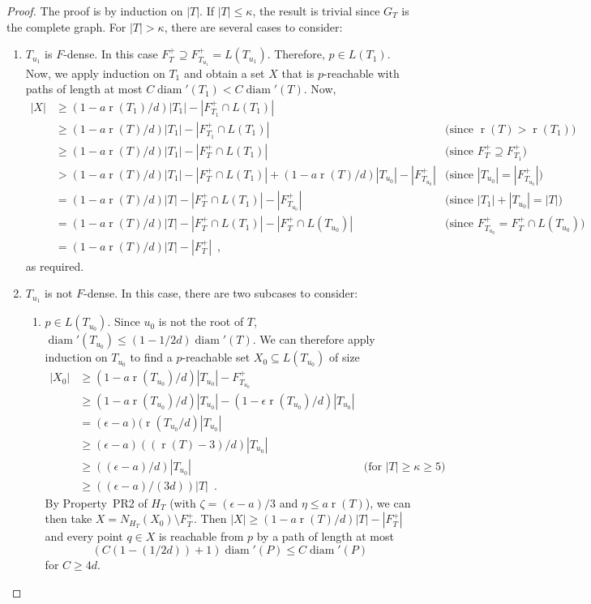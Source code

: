 \documentclass{patmorin}
\DeclareMathOperator{\rank}{r}
\DeclareMathOperator{\diam}{diam}
\begin{document}
\begin{proof}
  The proof is by induction on $|T|$.  If $|T|\le\kappa$, the result is trivial since $G_T$ is the complete graph.
  For $|T|>\kappa$, there are several cases to consider:
  \begin{enumerate}
	  \item $T_{u_1}$ is $F$-dense. In this case $F^+_T\supseteq
	  F^+_{T_{u_1}}= L(T_{u_1})$. Therefore, $p\in L(T_1)$.
          Now, we apply induction on $T_1$
       and obtain a set $X$ that is $p$-reachable with paths of length at
		  most $C\diam'(T_1)< C\diam'(T)$.  Now, 
	\begin{align*}
		|X| & \ge (1-a\rank(T_1)/d)|T_1|-|F^+_{T_1} \cap L(T_1)| \\
		& \ge (1-a\rank(T)/d)|T_1|-|F^+_{T_1} \cap L(T_1)| 
	 	& \text{(since $\rank(T)>\rank(T_1)$)} \\
		& \ge (1-a\rank(T)/d)|T_1|-|F^+_{T} \cap L(T_1)| 
		& \text{(since $F^+_T\supseteq F^+_{T_1}$)} \\
		& > (1-a\rank(T)/d)|T_1|-|F^+_{T} \cap L(T_1)| 
		  + (1-a\rank(T)/d)|T_{u_0}|-|F^+_{T_{u_0}}|
		& \text{(since $|T_{u_0}|=|F^+_{T_{u_0}}|$)} \\
		& = (1-a\rank(T)/d)|T|-|F^+_{T}\cap L(T_1)| - |F^+_{T_{u_0}}|
		& \text{(since $|T_1|+|T_{u_0}|=|T|$)} \\
		& = (1-a\rank(T)/d)|T|-|F^+_{T}\cap L(T_1)| - |F^+_T\cap L(T_{u_0})|
		& \text{(since $F^+_{T_{u_0}}=F^+_T\cap L(T_{u_0})$)} \\
		& = (1-a\rank(T)/d)|T|-|F^+_{T}| \enspace , 
	\end{align*}
	as required.
    \item $T_{u_1}$ is not $F$-dense. In this case, there are two subcases
    to consider:
    \begin{enumerate}
	    \item $p\in L(T_{u_0})$. 
		    Since $u_0$ is not the root of $T$, $\diam'(T_{u_0}) \le (1-1/2d)\diam'(T)$.  We can therefore apply induction on $T_{u_0}$ to find a $p$-reachable set $X_0\subseteq L(T_{u_0})$ of size 
\begin{align*}
	|X_0| & \ge (1-a\rank(T_{u_0})/d)|T_{u_0}|-F^+_{T_{u_0}} \\
	      & \ge (1-a\rank(T_{u_0})/d)|T_{u_0}|-(1-\epsilon\rank(T_{u_0})/d)|T_{u_0}| \\
	      & = (\epsilon-a)(\rank(T_{u_0}/d)|T_{u_0}| \\
	      & \ge (\epsilon-a)((\rank(T)-3)/d)|T_{u_0}| \\
	      & \ge ((\epsilon-a)/d)|T_{u_0}| 
		& \text{(for $|T|\ge \kappa \ge 5$)} \\
	      & \ge ((\epsilon-a)/(3d))|T| \enspace .
\end{align*}
		    By Property~PR2 of $H_T$ (with $\zeta = (\epsilon-a)/3$ and $\eta \le a\rank(T)$), we can then take $X=N_{H_T}(X_0)\setminus F^+_T$.  Then $|X| \ge (1-a\rank(T)/d)|T|-|F^+_T|$ and every point $q\in X$ is reachable from $p$ by a path of length at most
		    \[ (C(1-(1/2d))+1)\diam'(P) \le C\diam'(P) \]
	     for $C\ge 4d$.


\end{enumerate}
\end{enumerate}
\end{proof}
\end{document}
